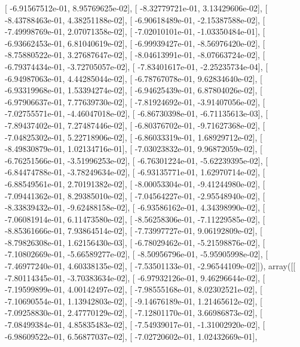 \documentclass{article}
\begin{document}
       [ -6.91567512e-01,   8.95769625e-02],
       [ -8.32779721e-01,   3.13429606e-02],
       [ -8.43788463e-01,   4.38251188e-02],
       [ -6.90618489e-01,  -2.15387588e-02],
       [ -7.49998769e-01,   2.07071358e-02],
       [ -7.02010101e-01,  -1.03350484e-01],
       [ -6.93662453e-01,   6.81040619e-02],
       [ -6.99939427e-01,  -8.56976420e-02],
       [ -8.75880522e-01,   3.27687647e-02],
       [ -8.04613991e-01,  -8.07663724e-02],
       [ -6.79374434e-01,  -3.72705057e-02],
       [ -7.83401617e-01,  -2.25235734e-04],
       [ -6.94987063e-01,   4.44285044e-02],
       [ -6.78767078e-01,   9.62834640e-02],
       [ -6.93319968e-01,   1.53394274e-02],
       [ -6.94625439e-01,   6.87804026e-02],
       [ -6.97906637e-01,   7.77639730e-02],
       [ -7.81924692e-01,  -3.91407056e-02],
       [ -7.02755571e-01,  -4.46047018e-02],
       [ -6.86730398e-01,  -6.71135613e-03],
       [ -7.89437402e-01,   7.27487446e-02],
       [ -6.80376702e-01,  -9.71627368e-02],
       [ -7.04825302e-01,   5.22718906e-02],
       [ -6.86033319e-01,   1.68929712e-02],
       [ -8.49830879e-01,   1.02134716e-01],
       [ -7.03023832e-01,   9.96872059e-02],
       [ -6.76251566e-01,  -3.51996253e-02],
       [ -6.76301224e-01,  -5.62239395e-02],
       [ -6.84474788e-01,  -3.78249634e-02],
       [ -6.93135771e-01,   1.62970714e-02],
       [ -6.88549561e-01,   2.70191382e-02],
       [ -8.00053304e-01,  -9.41244980e-02],
       [ -7.09441362e-01,   8.29385010e-02],
       [ -7.04564227e-01,  -2.95548940e-02],
       [ -8.33839432e-01,  -9.62488158e-02],
       [ -6.93586162e-01,   4.34398990e-02],
       [ -7.06081914e-01,   6.11473580e-02],
       [ -8.56258306e-01,  -7.11229585e-02],
       [ -8.85361666e-01,   7.93864514e-02],
       [ -7.73997727e-01,   9.06192809e-02],
       [ -8.79826308e-01,   1.62156430e-03],
       [ -6.78029462e-01,  -5.21598876e-02],
       [ -7.10802669e-01,  -5.66589277e-02],
       [ -8.50956796e-01,  -5.95905998e-02],
       [ -7.46977240e-01,   4.60338135e-02],
       [ -7.53501133e-01,  -2.96544109e-02]]), array([[ -7.80114345e-01,  -3.70383634e-02],
       [ -6.97932126e-01,   9.46296644e-02],
       [ -7.19599899e-01,   4.00142497e-02],
       [ -7.98555168e-01,   8.02302521e-02],
       [ -7.10690554e-01,   1.13942803e-02],
       [ -9.14676189e-01,   1.21465612e-02],
       [ -7.09258830e-01,   2.47770129e-02],
       [ -7.12801170e-01,   3.66986873e-02],
       [ -7.08499384e-01,   4.85835483e-02],
       [ -7.54939017e-01,  -1.31002920e-02],
       [ -6.98609522e-01,   6.56877037e-02],
       [ -7.02720602e-01,   1.02432669e-01],
\end{document}
